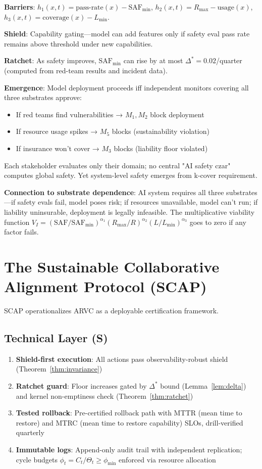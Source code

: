 \documentclass[11pt,a4paper]{article}
\begin{document}
\textbf{Barriers}: $h_1(x,t) = \text{pass-rate}(x) - \text{SAF}_{\min}$, $h_2(x,t) = R_{\max} - \text{usage}(x)$, $h_3(x,t) = \text{coverage}(x) - L_{\min}$.

\textbf{Shield}: Capability gating—model can add features only if safety eval pass rate remains above threshold under new capabilities.

\textbf{Ratchet}: As safety improves, $\text{SAF}_{\min}$ can rise by at most $\Delta^* = 0.02$/quarter (computed from red-team results and incident data).

\textbf{Emergence}: Model deployment proceeds iff independent monitors covering all three substrates approve:
\begin{itemize}
\item If red teams find vulnerabilities → $M_1, M_2$ block deployment
\item If resource usage spikes → $M_5$ blocks (sustainability violation)
\item If insurance won't cover → $M_3$ blocks (liability floor violated)
\end{itemize}
Each stakeholder evaluates only their domain; no central "AI safety czar" computes global safety. Yet system-level safety emerges from k-cover requirement.

\textbf{Connection to substrate dependence}: AI system requires all three substrates—if safety evals fail, model poses risk; if resources unavailable, model can't run; if liability uninsurable, deployment is legally infeasible. The multiplicative viability function $V_I = (\text{SAF}/\text{SAF}_{\min})^{\alpha_1} (R_{\max}/R)^{\alpha_2} (L/L_{\min})^{\alpha_3}$ goes to zero if any factor fails.

\section{The Sustainable Collaborative Alignment Protocol (SCAP)}

SCAP operationalizes ARVC as a deployable certification framework.

\subsection{Technical Layer (S)}

\begin{enumerate}
\item \textbf{Shield-first execution}: All actions pass observability-robust shield (Theorem~\ref{thm:invariance})
\item \textbf{Ratchet guard}: Floor increases gated by $\Delta^*$ bound (Lemma~\ref{lem:delta}) and kernel non-emptiness check (Theorem~\ref{thm:ratchet})
\item \textbf{Tested rollback}: Pre-certified rollback path with MTTR (mean time to restore) and MTRC (mean time to restore capability) SLOs, drill-verified quarterly
\item \textbf{Immutable logs}: Append-only audit trail with independent replication; cycle budgets $\phi_t = C_t/\Theta_t \geq \phi_{\min}$ enforced via resource allocation
\end{enumerate}
\end{document}
